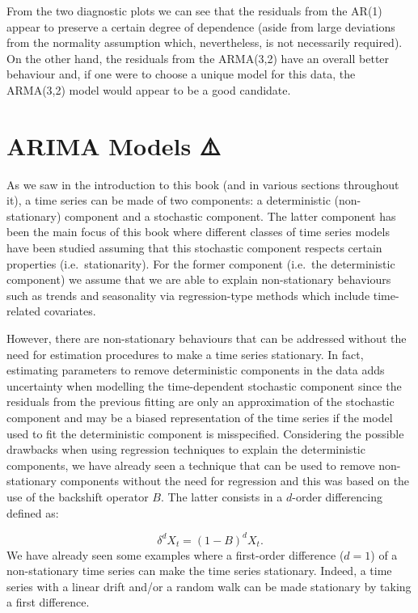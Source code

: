 \documentclass[]{book}
\theoremstyle{definition}
\theoremstyle{definition}
\theoremstyle{definition}
\theoremstyle{remark}
\begin{document}
From the two diagnostic plots we can see that the residuals from the
AR(1) appear to preserve a certain degree of dependence (aside from
large deviations from the normality assumption which, nevertheless, is
not necessarily required). On the other hand, the residuals from the
ARMA(3,2) have an overall better behaviour and, if one were to choose a
unique model for this data, the ARMA(3,2) model would appear to be a
good candidate.

\section{ARIMA Models ⚠️}\label{arima-models}

As we saw in the introduction to this book (and in various sections
throughout it), a time series can be made of two components: a
deterministic (non-stationary) component and a stochastic component. The
latter component has been the main focus of this book where different
classes of time series models have been studied assuming that this
stochastic component respects certain properties (i.e.~stationarity).
For the former component (i.e.~the deterministic component) we assume
that we are able to explain non-stationary behaviours such as trends and
seasonality via regression-type methods which include time-related
covariates.

However, there are non-stationary behaviours that can be addressed
without the need for estimation procedures to make a time series
stationary. In fact, estimating parameters to remove deterministic
components in the data adds uncertainty when modelling the
time-dependent stochastic component since the residuals from the
previous fitting are only an approximation of the stochastic component
and may be a biased representation of the time series if the model used
to fit the deterministic component is misspecified. Considering the
possible drawbacks when using regression techniques to explain the
deterministic components, we have already seen a technique that can be
used to remove non-stationary components without the need for regression
and this was based on the use of the backshift operator \(B\). The
latter consists in a \(d\)-order differencing defined as:

\[\delta^d X_t = (1 - B)^d X_t.\] We have already seen some examples
where a first-order difference (\(d=1\)) of a non-stationary time series
can make the time series stationary. Indeed, a time series with a linear
drift and/or a random walk can be made stationary by taking a first
difference.
\end{document}
